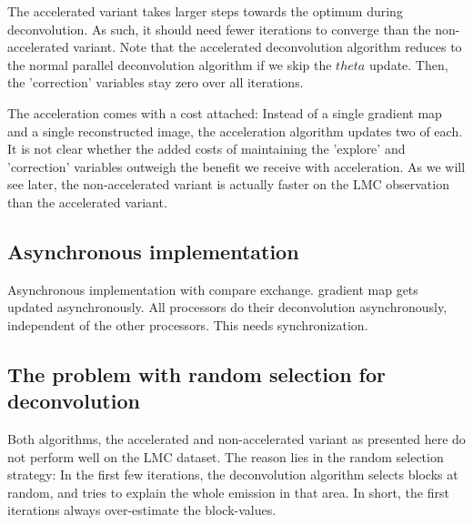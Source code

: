 The accelerated variant takes larger steps towards the optimum during deconvolution. As such, it should need fewer iterations to converge than the non-accelerated variant. Note that the accelerated deconvolution algorithm reduces to the normal parallel deconvolution algorithm if we skip the $theta$ update. Then, the 'correction' variables stay zero over all iterations.

The acceleration comes with a cost attached: Instead of a single gradient map and a single reconstructed image, the acceleration algorithm updates two of each. It is not clear whether the added costs of maintaining the 'explore' and 'correction' variables outweigh the benefit we receive with acceleration. As we will see later, the non-accelerated variant is actually faster on the LMC observation than the accelerated variant.

\subsection{Asynchronous implementation}


Asynchronous implementation with compare exchange. gradient map gets updated asynchronously.
All processors do their deconvolution asynchronously, independent of the other processors. This needs synchronization.

\subsection{The problem with random selection for deconvolution} \label{pcdm:adaption}
Both algorithms, the accelerated and non-accelerated variant as presented here do not perform well on the LMC dataset. The reason lies in the random selection strategy: In the first few iterations, the deconvolution algorithm selects blocks at random, and tries to explain the whole emission in that area. In short, the first iterations always over-estimate the block-values. 

